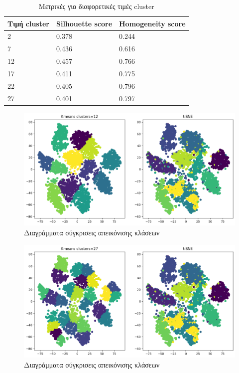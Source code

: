 \begin{table}[ht]
	\centering
	\caption{Μετρικές για διαφορετικές τιμές cluster}
	\begin{tabular}{l | l | l}
		Τιμή cluster & Silhouette score &  Homogeneity score\\
		\hline
		2 & 0.378 & 0.244\\
		7 & 0.436 & 0.616\\
		12 & 0.457&0.766\\
		17 & 0.411 & 0.775\\
		22 &0.405 & 0.796\\
		27 & 0.401 & 0.797\\
	\end{tabular}
	
	\label{tab:abc1}
\end{table}
\begin{figure}[ht]
	\centering
	\includegraphics[width=1\linewidth]{Imagedata1/k_12tsne.png}
	\caption{ Διαγράμματα σύγκρισεις απεικόνισης κλάσεων }
	\label{f:g5}	
\end{figure}
\begin{figure}[ht]
	\centering
	\includegraphics[width=1\linewidth]{Imagedata1/k_27tsne.png}
	\caption{ Διαγράμματα σύγκρισεις απεικόνισης κλάσεων }
	\label{f:g6}	
\end{figure}
\clearpage

